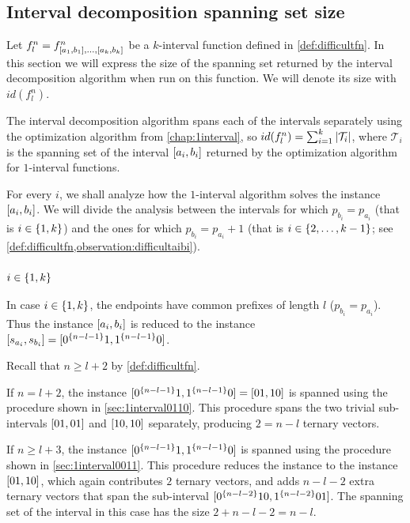 \subsection{Interval decomposition spanning set size}

Let $f_l^n =
f^n_{[a_1, b_1], \ldots, [a_k, b_k]}$
be a $k$-interval function
defined in \cref{def:difficultfn}.
In this section we will express
the size of the spanning set
returned by the interval decomposition algorithm
when run on this function.
We will denote its size with $id(f_l^n)$.

The interval decomposition algorithm spans
each of the intervals separately
using the optimization algorithm
from \cref{chap:1interval},
so $id(f_l^n) = \sum_{i=1}^k{\lvert\mathcal{T}_i\rvert}$,
where $\mathcal{T}_i$ is the spanning set
of the interval $[a_i, b_i]$
returned by the optimization algorithm
for $1$-interval functions.

For every $i$,
we shall analyze how the $1$-interval algorithm solves
the instance $[a_i, b_i]$.
We will divide the analysis between the intervals
for which $p_{b_i} = p_{a_i}$
(that is $i \in \{1, k\}$)
and the ones for which $p_{b_i} = p_{a_i} + 1$
(that is $i \in \{2, \ldots, k-1\}$;
see
\cref{def:difficultfn,observation:difficultaibi}).

\subsubsection{$i \in \{1, k\}$}

In case $i \in \{1, k\}$,
the endpoints have common prefixes of length $l$
($p_{b_i} = p_{a_i}$).
Thus the instance $[a_i, b_i]$
is reduced to the instance
$[s_{a_i}, s_{b_i}]
= [0^{\{n-l-1\}} 1, 1^{\{n-l-1\}} 0]$.

Recall that $n \geq l + 2$ by \cref{def:difficultfn}.

If $n = l + 2$,
the instance
$[0^{\{n-l-1\}} 1, 1^{\{n-l-1\}} 0]
= [01, 10]$
is spanned using the procedure
shown in \cref{sec:1interval0110}.
This procedure spans the two trivial sub-intervals
$[01, 01]$ and $[10, 10]$
separately,
producing $2 = n-l$ ternary vectors.

If $n \geq l + 3$,
the instance
$[0^{\{n-l-1\}} 1, 1^{\{n-l-1\}} 0]$
is spanned using the procedure
shown in \cref{sec:1interval0011}.
This procedure reduces the instance
to the instance $[01, 10]$,
which again contributes $2$ ternary vectors,
and adds $n-l-2$ extra ternary vectors
that span the sub-interval
$[0^{\{n-l-2\}} 10, 1^{\{n-l-2\}} 01]$.
The spanning set of the interval in this case has the size
$2 + n - l - 2 = n - l$.

